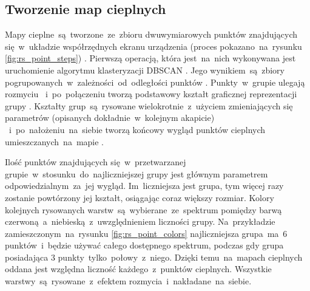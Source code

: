 \subsection{Tworzenie map cieplnych}
Mapy cieplne~są~tworzone~ze~zbioru dwuwymiarowych punktów znajdujących się~w~układzie współrzędnych ekranu urządzenia (proces pokazano~na~rysunku \ref{fig:rs_point_steps}) . Pierwszą operacją, która jest~na~nich wykonywana jest uruchomienie algorytmu klasteryzacji DBSCAN \cite{DBSCAN_Wiki}. Jego wynikiem~są~zbiory pogrupowanych~w~zależności~od~odległości punktów . Punkty~w~grupie ulegają rozmyciu ~i~po~połączeniu tworzą podstawowy kształt graficznej reprezentacji grupy . Kształty grup~są~rysowane wielokrotnie~z~użyciem zmieniających się parametrów (opisanych dokładnie~w~kolejnym akapicie) ~i~po~nałożeniu~na~siebie tworzą końcowy wygląd punktów cieplnych umieszczanych~na~mapie .

\bigskip
{}

Ilość punktów znajdujących się~w~przetwarzanej grupie~w~stosunku~do~najliczniejszej grupy jest głównym parametrem odpowiedzialnym~za~jej wygląd. Im~liczniejsza jest grupa, tym więcej razy zostanie powtórzony jej kształt, osiągając coraz większy rozmiar. Kolory kolejnych rysowanych warstw~są~wybierane~ze~spektrum pomiędzy barwą czerwoną~a~niebieską~z~uwzględnieniem liczności grupy. Na~przykładzie zamieszczonym~na~rysunku \ref{fig:rs_point_colors} najliczniejsza grupa~ma~$6$ punktów~i~będzie używać całego dostępnego spektrum, podczas gdy grupa posiadająca $3$ punkty~tylko~połowy~z~niego. Dzięki temu~na~mapach cieplnych oddana jest względna liczność każdego~z~punktów cieplnych. Wszystkie warstwy~są~rysowane~z~efektem rozmycia~i~nakładane~na~siebie. 

\bigskip
{}
